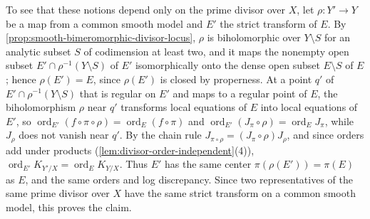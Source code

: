 To see that these notions depend only on the prime divisor over $X$, let $\rho\colon Y'\to Y$ be a map from a common smooth model and $E'$ the strict transform of $E$. By \cref{prop:smooth-bimeromorphic-divisor-locus}, $\rho$ is biholomorphic over $Y\setminus S$ for an analytic subset $S$ of codimension at least two, and it maps the nonempty open subset $E'\cap\rho^{-1}(Y\setminus S)$ of $E'$ isomorphically onto the dense open subset $E\setminus S$ of $E$; hence $\rho(E')=E$, since $\rho(E')$ is closed by properness. At a point $q'$ of $E'\cap\rho^{-1}(Y\setminus S)$ that is regular on $E'$ and maps to a regular point of $E$, the biholomorphism $\rho$ near $q'$ transforms local equations of $E$ into local equations of $E'$, so $\operatorname{ord}_{E'}(f\circ\pi\circ\rho)=\operatorname{ord}_E(f\circ\pi)$ and $\operatorname{ord}_{E'}(J_\pi\circ\rho)=\operatorname{ord}_EJ_\pi$, while $J_\rho$ does not vanish near $q'$. By the chain rule $J_{\pi\circ\rho}=(J_\pi\circ\rho)J_\rho$, and since orders add under products (\cref{lem:divisor-order-independent}(4)), $\operatorname{ord}_{E'}K_{Y'/X}=\operatorname{ord}_EK_{Y/X}$. Thus $E'$ has the same center $\pi(\rho(E'))=\pi(E)$ as $E$, and the same orders and log discrepancy. Since two representatives of the same prime divisor over $X$ have the same strict transform on a common smooth model, this proves the claim.

